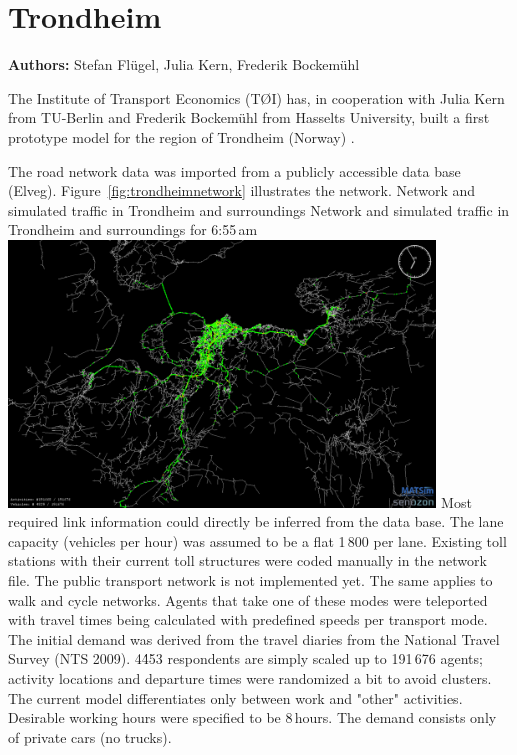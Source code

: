 \section{Trondheim}
\label{sec:trondheim}
\hfill \textbf{Authors:} Stefan Flügel, Julia Kern, Frederik Bockemühl

The Institute of Transport Economics (TØI) has, in cooperation with Julia Kern from TU-Berlin and Frederik Bockemühl from Hasselts University, built a first prototype model for the region of Trondheim (Norway) \citep[][]{FluegelKern_unpub_WTS_2014}.

The road network data was imported from a publicly accessible data base (Elveg). Figure~\ref{fig:trondheimnetwork} illustrates the network. 
%
\createfigure%
{Network and simulated traffic in Trondheim and surroundings}%
{Network and simulated traffic in Trondheim and surroundings for 6:55\,am \citep[source][]{FluegelEtAl_Samferdsel_2014}}%
{\label{fig:trondheimnetwork}}%
{\includegraphics[width=0.85\textwidth, angle=0]{./using/figures/trondheimnetwork.png}}%
{}
%
Most required link information could directly be inferred from the data base. The lane capacity (vehicles per hour) was assumed to be a flat 1\,800 per lane. Existing toll stations with their current toll structures were coded manually in the network file. The public transport network is not implemented yet. The same applies to walk and cycle networks. Agents that take one of these modes were teleported with travel times being calculated with predefined speeds per transport mode. 
The initial demand was derived from the travel diaries from the National Travel Survey (NTS 2009). 4\'453 respondents are simply scaled up to 191\,676 agents; activity locations and departure times were randomized a bit to avoid clusters. The current model differentiates only between work and "other" activities. Desirable working hours were specified to be 8\,hours. The demand consists only of private cars (no trucks). 

